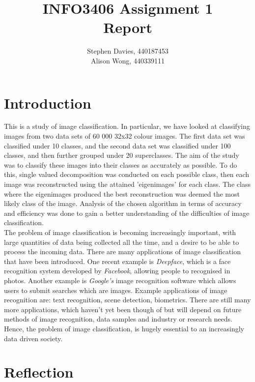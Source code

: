 \documentclass[11pt, oneside]{article}   	%
\title{INFO3406 Assignment 1\\ Report}
\author{Stephen Davies, 440187453\\ Alison Wong, 440339111}
\date{}							%
\begin{document}
\maketitle

\section*{Introduction}

\indent This is a study of image classification. In particular, we have looked at classifying images from two data sets of 60 000 32x32 colour images. The first data set was classified under 10 classes, and the second data set was classified under 100 classes, and then further grouped under 20 superclasses. The aim of the study was to classify these images into their classes as accurately as possible. To do this, single valued decomposition was conducted on each possible class, then each image was reconstructed using the attained 'eigenimages' for each class. The class where the eigenimages produced the best reconstruction was deemed the most likely class of the image. Analysis of the chosen algorithm in terms of accuracy and efficiency was done to gain a better understanding of the difficulties of image classification. 
\\ \indent The problem of image classification is becoming increasingly important, with large quantities of data being collected all the time, and a desire to be able to process the incoming data. There are many applications of image classification that have been introduced. One recent example is \textit{Deepface}, which is a face recognition system developed by \textit{Facebook}, allowing people to recognised in photos. Another example is \textit{Google's} image recognition software which allows users to submit searches which are images. Example applications of image recognition are: text recognition, scene detection, biometrics. There are still many more applications, which haven't yet been though of but will depend on future methods of image recognition, data samples and industry or research needs. Hence, the problem of image classification, is hugely essential to an increasingly data driven society.

\section*{Reflection}
\end{document}
